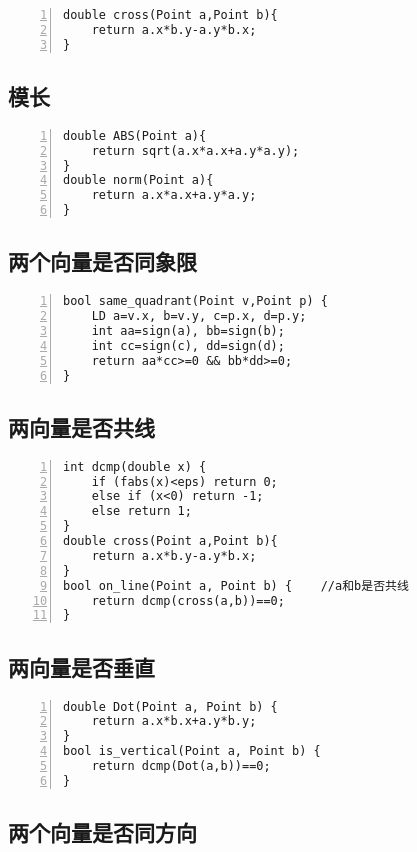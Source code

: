\begin{lstlisting}[language={[ANSI]C},numbers=left]
double cross(Point a,Point b){ 
	return a.x*b.y-a.y*b.x;
}
\end{lstlisting}

\subsection{模长}

\begin{lstlisting}[language={[ANSI]C},numbers=left]
double ABS(Point a){
	return sqrt(a.x*a.x+a.y*a.y);
}
double norm(Point a){
    return a.x*a.x+a.y*a.y;
}
\end{lstlisting}

\subsection{两个向量是否同象限}

\begin{lstlisting}[language={[ANSI]C},numbers=left]
bool same_quadrant(Point v,Point p) {
	LD a=v.x, b=v.y, c=p.x, d=p.y;
	int aa=sign(a), bb=sign(b);
	int cc=sign(c), dd=sign(d);
	return aa*cc>=0 && bb*dd>=0;
}
\end{lstlisting}

\subsection{两向量是否共线}

\begin{lstlisting}[language={[ANSI]C},numbers=left]
int dcmp(double x) {
	if (fabs(x)<eps) return 0;
	else if (x<0) return -1;
	else return 1;
}
double cross(Point a,Point b){ 
	return a.x*b.y-a.y*b.x;
}
bool on_line(Point a, Point b) {	//a和b是否共线 
	return dcmp(cross(a,b))==0;
}
\end{lstlisting}

\subsection{两向量是否垂直}

\begin{lstlisting}[language={[ANSI]C},numbers=left]
double Dot(Point a, Point b) {
	return a.x*b.x+a.y*b.y;
}
bool is_vertical(Point a, Point b) {
	return dcmp(Dot(a,b))==0;
}
\end{lstlisting}

\subsection{两个向量是否同方向}

